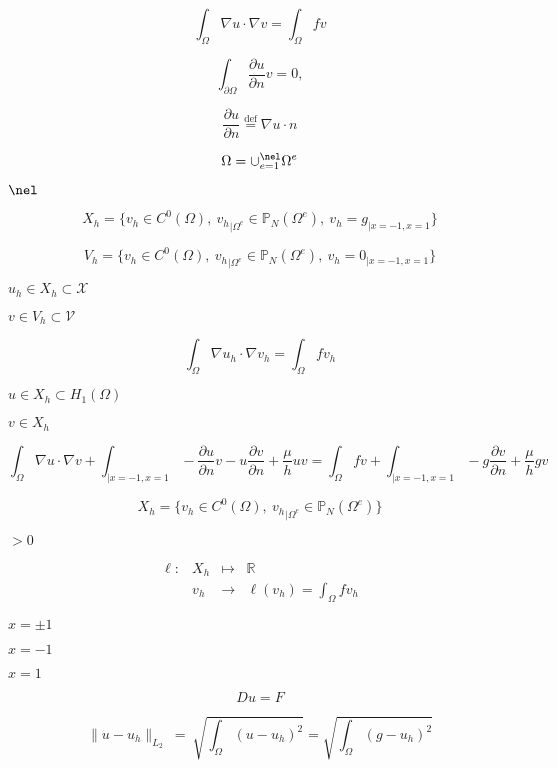 \documentclass{article}
\begin{document}
\[ \int_\Omega \nabla u \cdot \nabla v = \int_\Omega f v \]
\pagebreak

\[ \int_{\partial \Omega} \frac{\partial u}{\partial n} v = 0, \]
\pagebreak

\[ \label{eq:21} \frac{\partial u}{\partial n} \stackrel{\text{def}}{=} \nabla u \cdot n \]
\pagebreak

\[ \label{eq:10} \Omega = \cup_{e=1}^\nel \Omega^e \]
\pagebreak

$\nel$
\pagebreak

\[ \label{eq:17} X_h = \Big\{ v_h \in C^0(\Omega),\ {v_h}_{|\Omega^e} \in \mathbb{P}_N( \Omega^e ),\ v_h=g_{|x=-1,x=1}\Big\} \]
\pagebreak

\[ \label{eq:18} V_h = \Big\{ v_h \in C^0(\Omega),\ {v_h}_{|\Omega^e} \in \mathbb{P}_N( \Omega^e ),\ v_h=0_{|x=-1,x=1}\Big\} \]
\pagebreak

$u_h \in X_h \subset \mathcal{X}$
\pagebreak

$v \in V_h \subset \mathcal{V}$
\pagebreak

\[ \int_\Omega \nabla u_h \cdot \nabla v_h = \int_\Omega f v_h \]
\pagebreak

$u \in X_h \subset H_1(\Omega)$
\pagebreak

$v \in X_h$
\pagebreak

\[ \int_\Omega \nabla u \cdot \nabla v + \int_{|x=-1,x=1} -\frac{\partial u}{\partial n} v - u \frac{\partial v}{\partial n} + \frac{\mu}{h} u v = \int_\Omega f v + \int_{|x=-1,x=1} - g \frac{\partial v}{\partial n} + \frac{\mu}{h} g v \]
\pagebreak

\[ \label{eq:19} X_h = \Big\{ v_h \in C^0(\Omega),\ {v_h}_{|\Omega^e} \in \mathbb{P}_N( \Omega^e ) \Big\} \]
\pagebreak

$> 0$
\pagebreak

\[ \begin{array}{rccl} \ell: & X_h & \mapsto & \mathbb{R}\\ & v_h & \rightarrow &\ell(v_h)=\int_\Omega f v_h \end{array} \]
\pagebreak

$x=\pm 1$
\pagebreak

$x=-1$
\pagebreak

$x=1$
\pagebreak

\[ D u = F \]
\pagebreak

\begin{equation} \label{eq:7} \|u-u_h\|_{L_2}\ =\ \sqrt{\int_\Omega (u-u_h)^2} = \sqrt{\int_\Omega (g-u_h)^2} \end{equation}
\pagebreak
\end{document}
